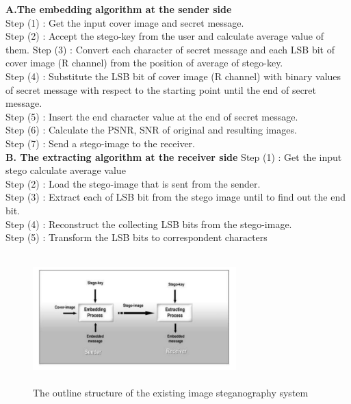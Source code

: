 \documentclass{report}
\begin{document}
\textbf{A.The embedding algorithm at the sender side }\\
Step (1) : Get the input cover image and secret message. \\
Step (2) : Accept the stego-key from the user and calculate average value of them. Step (3) : Convert each character of secret message and each LSB bit of cover image (R channel) from the position of average of stego-key. \\
Step (4) : Substitute the LSB bit of cover image (R channel) with binary values of secret message with respect to the starting point until the end of secret message. \\
Step (5) : Insert the end character value at the end of secret message. \\
Step (6) : Calculate the PSNR, SNR of original and resulting images. \\
Step (7) : Send a stego-image to the receiver. \\

\textbf{B. The extracting algorithm at the receiver side }
Step (1) : Get the input stego calculate average value \\
Step (2) : Load the stego-image that is sent from the sender. \\
Step (3) : Extract each of LSB bit from the stego image until to find out the end bit.\\
Step (4) : Reconstruct the collecting LSB bits from the stego-image. \\
Step (5) : Transform the LSB bits to correspondent characters\cite{aggarwal2019image}\\

\begin{figure}[htbp]
  \centering
  \includegraphics[width=0.7\textwidth, height=5cm]{image4.png} 
  \caption{The outline structure of the existing image steganography system\cite{aggarwal2019image} }
  \label{fig:3}
\end{figure}
\end{document}
